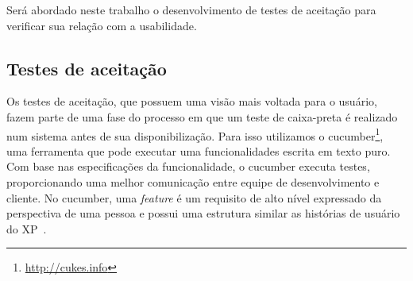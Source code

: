 Será abordado neste trabalho o desenvolvimento de testes de aceitação para verificar sua relação com a usabilidade. 

\subsection{Testes de aceitação}

Os testes de aceitação, que possuem uma visão mais voltada para o usuário, fazem 
parte de uma fase do processo em que um teste de caixa-preta é realizado 
num sistema antes de sua disponibilização.
Para isso utilizamos o cucumber\footnote{\url{http://cukes.info}}, uma ferramenta que pode executar uma funcionalidades escrita em texto puro. Com base nas especificações da funcionalidade, o cucumber executa testes, proporcionando uma melhor comunicação entre equipe de desenvolvimento e cliente.
%
No cucumber, uma \textit{feature} é um requisito de alto nível 
expressado da perspectiva de uma pessoa e possui uma estrutura similar as histórias 
de usuário do XP~. 



